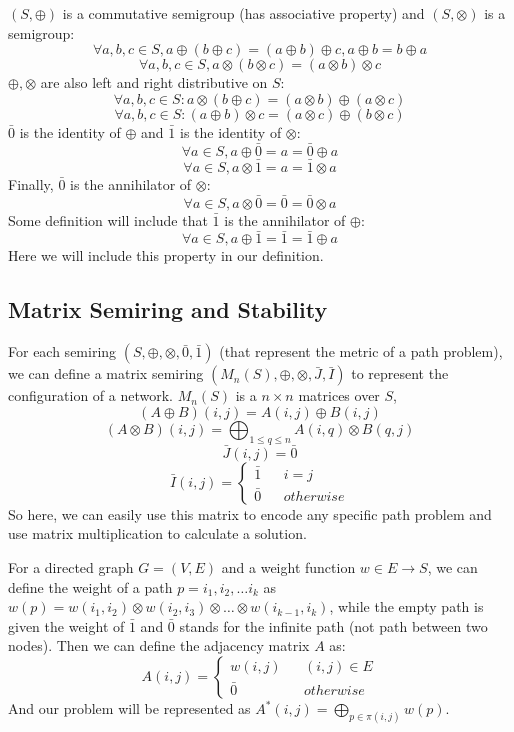 \documentclass[a4paper,12pt,twoside,openright]{report}
\begin{document}
$(S,\oplus)$ is a commutative semigroup (has associative property) and $(S,\otimes)$ is a semigroup:
\[
\forall a,b,c \in S, a \oplus (b\oplus c) = (a \oplus b) \oplus c,a \oplus b = b \oplus a
\]
\[
\forall a,b,c \in S, a \otimes (b\otimes c) = (a \otimes b) \otimes c
\]
$\oplus,\otimes$ are also left and right distributive on $S$: 
\[
\forall a,b,c \in S: a \otimes(b \oplus c) = (a \otimes b) \oplus (a \otimes c)
\]
\[
\forall a,b,c \in S:(a \oplus b) \otimes c  = (a \otimes c) \oplus (b \otimes c)
\] 
$\bar0$ is the identity of $\oplus$ and  $\bar1$ is the identity of $\otimes$: 
\[\forall a \in S, a \oplus \bar{0} = a = \bar{0} \oplus a\]
\[\forall a \in S, a \otimes \bar{1} = a = \bar{1} \otimes a\]
Finally, $\bar0$ is the  annihilator of $\otimes$: 
\[\forall a \in S, a \otimes \bar{0} = \bar{0} = \bar{0} \otimes a\]
Some definition will include that $\bar1$ is the annihilator of $\oplus$:
\[\forall a \in S, a \oplus \bar{1} = \bar{1} = \bar{1} \oplus a\]
Here we will include this property in our definition.
\subsection{Matrix Semiring and Stability}
For each semiring $(S,\oplus,\otimes,\bar0,\bar1)$ (that represent the metric of a path problem), we can define a matrix semiring $(M_n(S),\oplus,\otimes,\bar{J},\bar{I})$ to represent the configuration of a network. $M_n(S)$ is a $n\times n$ matrices over $S$,
\[(A \oplus B)(i,j) = A(i,j)\oplus B(i,j)\]
\[(A \otimes B)(i,j) = \bigoplus_{1\leq q \leq n}A(i,q)\otimes B(q,j)\]
\[\bar{J}(i,j) = \bar0\]
\[\bar{I}(i,j)=\left\{
\begin{array}{rcl}
\bar1       &      & {i = j}\\
\bar0     &      & {otherwise}
\end{array} \right.\]
So here, we can easily use this matrix to encode any specific path problem and use matrix multiplication to calculate a solution. 

For a directed graph $G = (V,E)$ and a weight function $w \in E \rightarrow S$, 
we can define the weight of a path $p = i_1,i_2, \dots i_k$ as $w(p) = w (i_1,i_2) \otimes w(i_2,i_3)\otimes \dots \otimes w(i_{k-1},i_k)$, while the empty path is given the weight of $\bar1$ and $\bar0$ stands for the infinite path (not path between two nodes).
Then we can define the adjacency matrix $A$ as: 
\[A(i,j)=\left\{
\begin{array}{rcl}
w(i,j)      &      & {(i,j)\in E}\\
\bar0     &      & {otherwise}
\end{array} \right.\]
And our problem will be represented as $A^*(i,j) = \bigoplus_{p \in \pi (i,j)}w(p)$.
\end{document}
